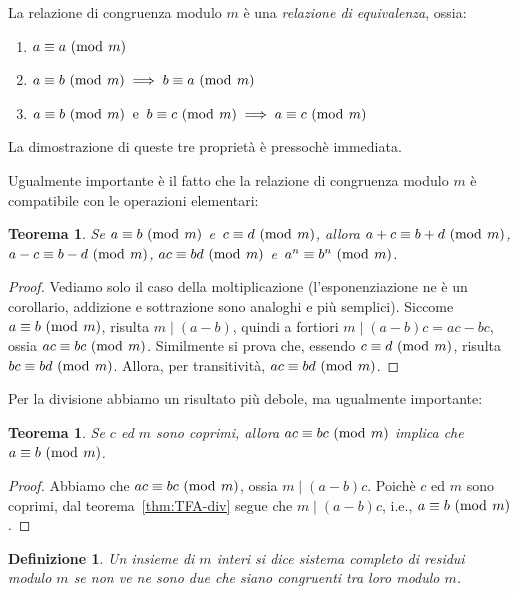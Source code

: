 \documentclass[pdflatex,11pt,a4paper,oneside]{article}
\let\OldEmph\emph
\renewcommand{\emph}[1]{\OldEmph{#1\/}}
\newcommand{\p}[1]{\left({#1}\right)}
\newcommand{\divides}[0]{\mid}
\newcommand{\congruent}[0]{\equiv}
\newcommand{\mmodop}[0]{\ensuremath{\operatorname{mod}}}
\newcommand{\mmod}[1]{\ensuremath{\allowbreak\ (\mmodop\:{#1})}}
\newtheorem{theorem}[TheoremLike]{Teorema}
\newtheorem{definition}[TheoremLike]{Definizione}
\begin{document}
La relazione di congruenza modulo $m$ \`e una \emph{relazione di
equivalenza}, ossia:
\begin{enumerate}
\item $a \congruent a \mmod m$
\item $a \congruent b \mmod m \implies b \congruent a \mmod m$
\item $a \congruent b \mmod m ~\:\textrm{e}\:~
       b \congruent c \mmod m \implies
       a \congruent c \mmod m$
\end{enumerate}
La dimostrazione di queste tre propriet\`a \`e pressoch\`e immediata.

\smallskip
Ugualmente importante \`e il fatto che la relazione di congruenza
modulo $m$ \`e compatibile con le operazioni elementari:
%
\begin{theorem}\label{thm:modular-operation}
Se $a \congruent b \mmod m$ e\, $c \congruent d \mmod m$, allora
$a + c \congruent b + d \mmod m$, $a - c \congruent b - d \mmod m$,
$ac \congruent bd \mmod m$ e\, $a^n \congruent b^n \mmod m$.

\end{theorem}
%
\begin{proof}
Vediamo solo il caso della moltiplicazione (l'esponenziazione ne \`e
un corollario, addizione e sottrazione sono analoghi e pi\`u semplici).
Siccome $a \congruent b \mmod m$, risulta $m \divides \p{a - b}$,
quindi a fortiori $m \divides \p{a - b}c = ac - bc$, ossia
$ac \congruent bc \mmod m$.  Similmente si prova che, essendo
$c \congruent d \mmod m$, risulta $bc \congruent bd \mmod m$.
Allora, per transitivit\`a, $ac \congruent bd \mmod m$.
\end{proof}

Per la divisione abbiamo un risultato pi\`u debole, ma ugualmente
importante:
%
\begin{theorem}\label{thm:simplify-modulo-m}
Se $c$ ed $m$ sono coprimi, allora $ac \congruent bc \mmod m$ implica
che $a \congruent b \mmod m$.
\end{theorem}
%
\begin{proof}
Abbiamo che $ac \congruent bc \mmod m$, ossia $m \divides \p{a -b}c$.
Poich\`e $c$ ed $m$ sono coprimi, dal teorema~\eqref{thm:TFA-div}
segue che $m \divides \p{a -b}c$, i.e., $a \congruent b \mmod m$.
\end{proof}

\begin{definition}
Un insieme di $m$ interi si dice \emph{sistema completo di residui modulo
$m$} se non ve ne sono due che siano congruenti tra loro modulo $m$.
\end{definition}
\end{document}
